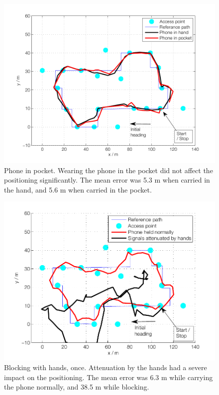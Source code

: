 \documentclass{LTHthesis}
\begin{document}
\begin{figure}

\includegraphics[width=1\textwidth ]{images/adapt_parameters/positioning_pocket}
\caption{Phone in pocket. Wearing the phone in the pocket did not affect the positioning significantly. The mean error was 5.3 m when carried in the hand, and 5.6 m when carried in the pocket.}\label{positioning_pocket}
\end{figure}

\begin{figure}

\includegraphics[width=1\textwidth ]{images/adapt_parameters/hand_block}
\caption{Blocking with hands, once. Attenuation by the hands had a severe impact on the positioning. The mean error was 6.3 m while carrying the phone normally, and 38.5 m while blocking.}\label{hand_block}
\end{figure}
\end{document}
